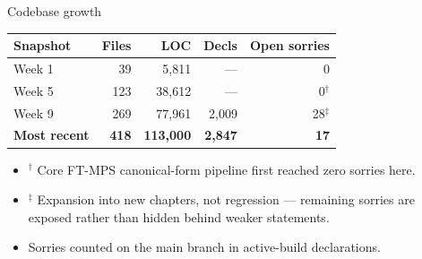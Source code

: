\documentclass[aspectratio=169,10pt]{beamer}
\begin{document}
\begin{frame}{Codebase growth}
    \begin{center}
    \renewcommand{\arraystretch}{1.15}
    {\footnotesize
    \begin{tabular}{@{}l r r r r@{}}
        \toprule
        \textbf{Snapshot}    & \textbf{Files} & \textbf{LOC}      & \textbf{Decls}   & \textbf{Open sorries} \\
        \midrule
        Week 1               & 39             & 5{,}811           & ---              & 0 \\
        Week 5               & 123            & 38{,}612          & ---              & 0$^\dagger$ \\
        Week 9               & 269            & 77{,}961          & 2{,}009          & 28$^\ddagger$ \\
        \textbf{Most recent} & \textbf{418}   & \textbf{113{,}000} & \textbf{2{,}847} & \textbf{17} \\
        \bottomrule
    \end{tabular}}
    \end{center}
    \vspace{0.4em}
    \begin{itemize}
        \item \textcolor{dimwhite}{$^\dagger$ Core FT-MPS canonical-form pipeline first reached zero sorries here.}
        \item \textcolor{dimwhite}{$^\ddagger$ Expansion into new chapters, not regression --- remaining sorries are exposed rather than hidden behind weaker statements.}
        \item Sorries counted on the main branch in active-build declarations.
    \end{itemize}
\end{frame}
\end{document}

